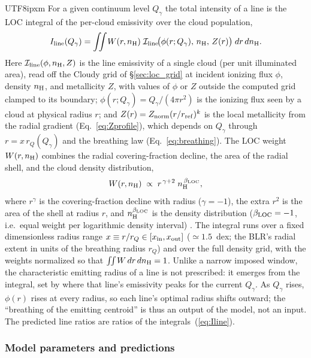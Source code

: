\documentclass[linenumbers,trackchanges]{aastex701}
\begin{document}
\begin{CJK*}{UTF8}{ipxm}
For a given continuum level $Q_\gamma$ the total intensity of a line is the LOC integral of
the per-cloud emissivity over the cloud population,
\begin{equation}
    I_{\rm line}(Q_\gamma) = \iint W(r, n_{\rm H})\;
    \mathcal{I}_{\rm line}\!\big(\phi(r; Q_\gamma),\, n_{\rm H},\, Z(r)\big)\;
    dr\, dn_{\rm H}.
    \label{eq:Iline}
\end{equation}
Here $\mathcal{I}_{\rm line}(\phi, n_{\rm H}, Z)$ is the line emissivity of a single cloud
(per unit illuminated area), read off the Cloudy grid of \S\ref{sec:loc_grid} at incident
ionizing flux $\phi$, density $n_{\rm H}$, and metallicity $Z$, with values of $\phi$ or $Z$
outside the computed grid clamped to its boundary; $\phi(r; Q_\gamma) = Q_\gamma/(4\pi r^2)$ is
the ionizing flux seen by a cloud at physical radius $r$; and $Z(r) = Z_{\rm norm}(r/r_{\rm ref})^{k}$
is the local metallicity from the radial gradient (Eq.~\ref{eq:Zprofile}), which depends on
$Q_\gamma$ through $r = x\,r_Q(Q_\gamma)$ and the breathing law (Eq.~\ref{eq:breathing}).  The
LOC weight $W(r, n_{\rm H})$ combines the radial covering-fraction decline, the area of the
radial shell, and the cloud density distribution,
\begin{equation}
    W(r, n_{\rm H}) \;\propto\; r^{\,\gamma+2}\; n_{\rm H}^{\,\beta_{\rm LOC}},
    \label{eq:Wloc}
\end{equation}
where $r^{\gamma}$ is the covering-fraction decline with radius ($\gamma = -1$), the extra
$r^{2}$ is the area of the shell at radius $r$, and $n_{\rm H}^{\beta_{\rm LOC}}$ is the density
distribution ($\beta_{\rm LOC} = -1$, i.e.\ equal weight per logarithmic density interval)
\citep{Baldwin1995, Korista2004}.  The integral runs over a fixed dimensionless radius range
$x \equiv r/r_Q \in [x_{\rm in}, x_{\rm out}]$ ($\simeq 1.5$~dex; the BLR's radial extent in
units of the breathing radius $r_Q$) and over the full density grid, with the weights
normalized so that $\iint W\, dr\, dn_{\rm H} = 1$.  Unlike a narrow imposed window, the
characteristic emitting radius of a line is not prescribed: it emerges from the integral,
set by where that line's emissivity peaks for the current $Q_\gamma$.  As $Q_\gamma$ rises,
$\phi(r)$ rises at every radius, so each line's optimal radius shifts outward; the
``breathing of the emitting centroid'' is thus an output of the model, not an input.  The
predicted line ratios are ratios of the integrals~(\ref{eq:Iline}).

\subsubsection{Model parameters and predictions}


\end{CJK*}
\end{document}
